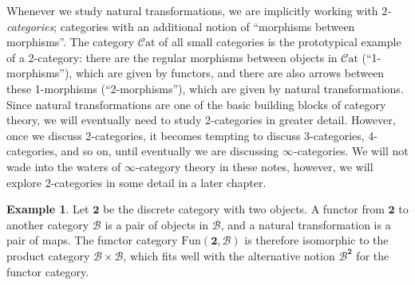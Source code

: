 \documentclass[10pt,oneside]{book}
\def\~#1{\mathscr{#1}}
\newcommand{\Fun}{\mathrm{Fun}}
\newcommand{\Cat}{\~C\mathrm{at}}
\theoremstyle{plain}
\theoremstyle{definition}
\newtheorem{ex}[thm]{Example}
\theoremstyle{remark}
\numberwithin{equation}{section}
\numberwithin{figure}{section}
\begin{document}
Whenever we study natural transformations, we are implicitly working with \emph{$2$-categories}; categories with an additional notion of ``morphisms between morphisms''. The category $\Cat$ of all small categories is the prototypical example of a $2$-category: there are the regular morphisms between objects in $\Cat$ (``1-morphisms''), which are given by functors, and there are also arrows between these 1-morphisms (``2-morphisms''), which are given by natural transformations. Since natural transformations are one of the basic building blocks of category theory, we will eventually need to study 2-categories in greater detail. However, once we discuss 2-categories, it becomes tempting to discuss 3-categories, 4-categories, and so on, until eventually we are discussing $\infty$-categories. We will not wade into the waters of $\infty$-category theory in these notes, however, we will explore 2-categories in some detail in a later chapter. 

\begin{ex}
    Let $\mathbf{2}$ be the discrete category with two objects. A functor from $\mathbf{2}$ to another category $\~B$ is a pair of objects in $\~B$, and a natural transformation is a pair of maps. The functor category $\Fun(\mathbf{2}, \~B)$ is therefore isomorphic to the product category $\~B \times \~B$, which fits well with the alternative notion $\~B^\mathbf{2}$ for the functor category.
\end{ex}
\end{document}
